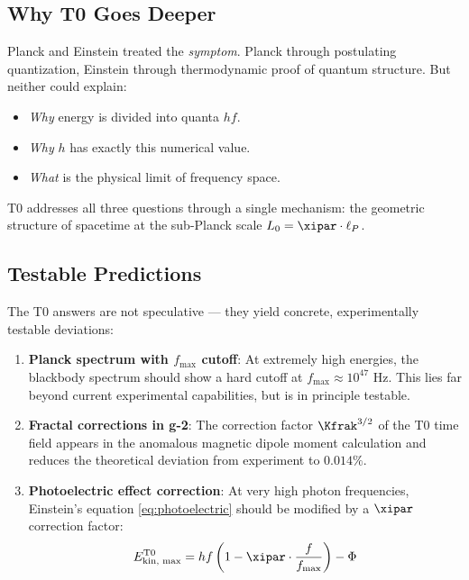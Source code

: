 \subsection{Why T0 Goes Deeper}

Planck and Einstein treated the \emph{symptom}. Planck through postulating 
quantization, Einstein through thermodynamic proof of quantum structure. But neither 
could explain:

\begin{itemize}
    \item \emph{Why} energy is divided into quanta $hf$.
    \item \emph{Why} $h$ has exactly this numerical value.
    \item \emph{What} is the physical limit of frequency space.
\end{itemize}

T0 addresses all three questions through a single mechanism: the geometric structure 
of spacetime at the sub-Planck scale $L_0 = \xipar \cdot \ell_P$.

\subsection{Testable Predictions}

The T0 answers are not speculative — they yield concrete, experimentally testable 
deviations:

\begin{enumerate}
    \item \textbf{Planck spectrum with $f_{\max}$ cutoff}: At extremely high energies, 
    the blackbody spectrum should show a hard cutoff at $f_{\max} \approx 10^{47}$ Hz. 
    This lies far beyond current experimental capabilities, but is in principle testable.
    
    \item \textbf{Fractal corrections in g-2}: The correction factor $\Kfrak^{3/2}$ 
    of the T0 time field appears in the anomalous magnetic dipole moment calculation 
    and reduces the theoretical deviation from experiment to $0.014\%$.
    
    \item \textbf{Photoelectric effect correction}: At very high photon frequencies, 
    Einstein's equation \eqref{eq:photoelectric} should be modified by a $\xipar$ 
    correction factor:
    \begin{equation}
        E_{\text{kin, max}}^{\text{T0}} = hf\left(1 - \xipar \cdot \frac{f}{f_{\max}}\right) - \Phi
        \label{eq:photoelectric_t0}
    \end{equation}
\end{enumerate}

